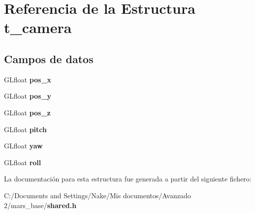 \section{Referencia de la Estructura t\_\-camera}
\label{structt__camera}
\subsection*{Campos de datos}
\begin{DoxyCompactItemize}
\item 
GLfloat {\bfseries pos\_\-x}\label{structt__camera_acf5bd6264eb4cf2fc289e45463ec7b7e}

\item 
GLfloat {\bfseries pos\_\-y}\label{structt__camera_a3e46f59d3bc9ecd53f8e9619ba5656f9}

\item 
GLfloat {\bfseries pos\_\-z}\label{structt__camera_a243cc20cbd2103082138ca29fe4c171e}

\item 
GLfloat {\bfseries pitch}\label{structt__camera_aa2c20d25f71a808e97164d98c4698cbe}

\item 
GLfloat {\bfseries yaw}\label{structt__camera_a0efaed02e035b5fa643166061b5b8ddf}

\item 
GLfloat {\bfseries roll}\label{structt__camera_afe415f855bb7e02099c2d1906a4cd9cd}

\end{DoxyCompactItemize}


La documentación para esta estructura fue generada a partir del siguiente fichero:\begin{DoxyCompactItemize}
\item 
C:/Documents and Settings/Nake/Mis documentos/Avanzado 2/mars\_\-base/{\bf shared.h}\end{DoxyCompactItemize}

